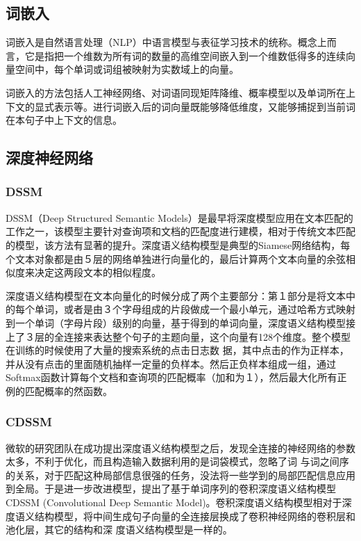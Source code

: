 \documentclass[a4paper]{article}
\begin{document}
\subsection{词嵌入}
词嵌入是自然语言处理（NLP）中语言模型与表征学习技术的统称。概念上而言，它是指把一个维数为所有词的数量的高维空间嵌入到一个维数低得多的连续向量空间中，每个单词或词组被映射为实数域上的向量。

词嵌入的方法包括人工神经网络、对词语同现矩阵降维、概率模型以及单词所在上下文的显式表示等。进行词嵌入后的词向量既能够降低维度，又能够捕捉到当前词在本句子中上下文的信息。

\subsection{深度神经网络}
\subsubsection{DSSM}
DSSM（Deep Structured Semantic Models）\cite{huang2013learning}是最早将深度模型应用在文本匹配的工作之一，该模型主要针对查询项和文档的匹配度进行建模，相对于传统文本匹配的模型，该方法有显著的提升。深度语义结构模型是典型的Siamese网络结构，每个文本对象都是由５层的网络单独进行向量化的，最后计算两个文本向量的余弦相似度来决定这两段文本的相似程度。

深度语义结构模型在文本向量化的时候分成了两个主要部分：第１部分是将文本中的每个单词，或者是由３个字母组成的片段做成一个最小单元，通过哈希方式映射到一个单词（字母片段）级别的向量，基于得到的单词向量，深度语义结构模型接上了３层的全连接来表达整个句子的主题向量，这个向量有128个维度。整个模型在训练的时候使用了大量的搜索系统的点击日志数
据，其中点击的作为正样本，并从没有点击的里面随机抽样一定量的负样本。然后正负样本组成一组，通过Softmax函数计算每个文档和查询项的匹配概率（加和为１），然后最大化所有正例的匹配概率的然函数。

\subsubsection{CDSSM}
微软的研究团队在成功提出深度语义结构模型之后，发现全连接的神经网络的参数太多，不利于优化，而且构造输入数据利用的是词袋模式，忽略了词
与词之间序的关系，对于匹配这种局部信息很强的任务，没法将一些学到的局部匹配信息应用到全局。于是进一步改进模型，提出了基于单词序列的卷积深度语义结构模型CDSSM (Convolutional Deep Semantic Model)\cite{shen2014learning}。卷积深度语义结构模型相对于深度语义结构模型，将中间生成句子向量的全连接层换成了卷积神经网络的卷积层和池化层，其它的结构和深
度语义结构模型是一样的。
\end{document}
